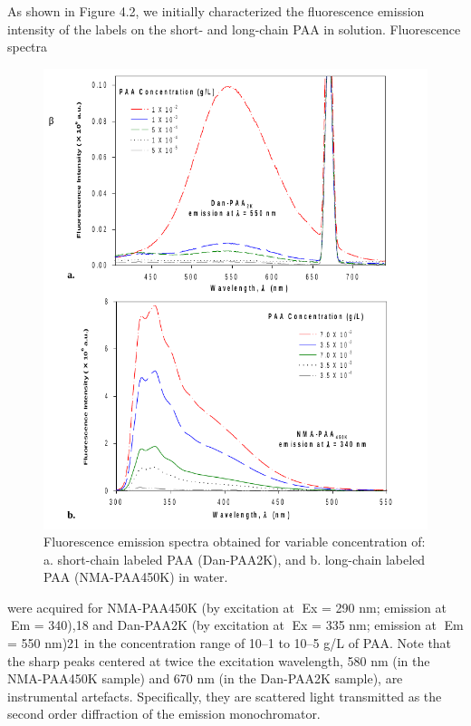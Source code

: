 \documentclass[journal=jacsat,manuscript=article]{achemso}
\begin{document}
As shown in Figure 4.2, we initially characterized the fluorescence emission intensity of the labels on the short- and long-chain PAA in solution.  Fluorescence spectra

\begin{figure}[H]
\includegraphics[scale=0.5]{fig2.png}
\caption{Fluorescence emission spectra obtained for variable concentration of: a. short-chain labeled PAA (Dan-PAA2K), and b. long-chain labeled PAA (NMA-PAA450K) in water.}
\label{figure 2}
\end{figure}

were acquired for NMA-PAA450K (by excitation at Ex = 290 nm; emission at Em = 340),18 and Dan-PAA2K (by excitation at Ex = 335 nm; emission at Em = 550 nm)21 in the concentration range of 10–1 to 10–5 g/L of PAA.  Note that the sharp peaks centered at twice the excitation wavelength, 580 nm (in the NMA-PAA450K sample) and 670 nm (in the Dan-PAA2K sample), are instrumental artefacts.  Specifically, they are scattered light transmitted as the second order diffraction of the emission monochromator. 
\end{document}
